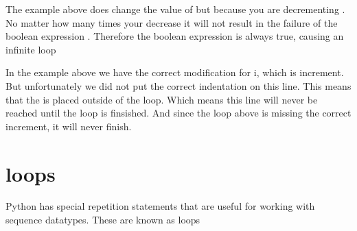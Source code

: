 \documentclass[letterpaper,10pt,english]{jupyterBook}
\begin{document}
\sphinxAtStartPar
The example above does change the value of  but because you are decrementing . No matter how many times your decrease  it will not result in the failure of the boolean expression . Therefore the boolean expression is always true, causing an infinite loop

\begin{sphinxVerbatim}[commandchars=\\\{\}]
   
   
    
\end{sphinxVerbatim}

\sphinxAtStartPar
In the example above we have the correct modification for i, which is increment. But unfortunately we did not put the correct indentation on this line. This means that the  is placed outside of the loop. Which means this line will never be reached until the loop is finsished. And since the loop above is missing the correct increment, it will never finish.


\section{ loops}
\label{\detokenize{loops:for-loops}}
\sphinxAtStartPar
Python has special repetition statements that are useful for working with sequence datatypes. These are known as  loops
\end{document}
